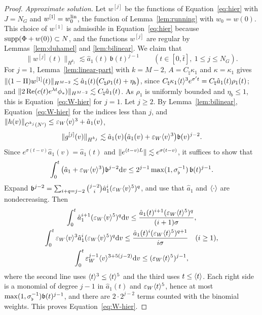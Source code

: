 \begin{proof}
\emph{Approximate solution.} Let $w^{[j]}$ be the functions of
Equation~\eqref{eq:hier} with $J=N_G$ and $w^{[1]}=w^{\mathrm{lin}}_0$, the function of
Lemma~\ref{lem:running} with $w_0=w(0)$. This choice of $w^{[1]}$ is admissible in
Equation~\eqref{eq:hier} because $\operatorname{supp}(\Phi+w(0))\subset N$, and the functions
$w^{[j]}$ are regular by Lemmas~\ref{lem:duhamel} and \ref{lem:bilinear}. We
claim that
\begin{equation}
\label{eq:W-hier}
\|w^{[j]}(t)\|_{H^{k_j}}\lesssim\hat a_1(t)\,\mathfrak b(t)^{j-1}\qquad(t\in[0,\bar t],\ 1\le j\le N_G).
\end{equation}
For $j=1$, Lemma~\ref{lem:linear-part} with $k=M-2$, $A=C_\natural\kappa_1$ and
$\kappa=\kappa_1$ gives
$\|(1-\Pi)w^{[1]}(t)\|_{H^{M-2}}\lesssim\hat a_1(t)\big(C_\natural\rho_1(t)+\eta_b\big)$,
since $C_\natural\kappa_1\langle t\rangle^3e^{\sigma't}=C_\natural\hat a_1(t)\rho_1(t)$; and
$\|2\Re(c(t)e^{\lambda t}\phi_*)\|_{H^{M-2}}\lesssim C_\natural\hat a_1(t)$. As
$\rho_1$ is uniformly bounded and $\eta_b\le1$, this is Equation~\eqref{eq:W-hier} for $j=1$.
Let $j\ge2$. By Lemma~\ref{lem:bilinear}, Equation~\eqref{eq:W-hier} for the
indices less than $j$, and
$\|h(v)\|_{C^{k_j}(N')}\le\varepsilon_W\langle v\rangle^3+\hat a_1(v)$,
\[
\|g^{[j]}(v)\|_{H^{k_j}}\lesssim\hat a_1(v)\big(\hat a_1(v)+\varepsilon_W\langle v\rangle^3\big)\mathfrak b(v)^{j-2}.
\]
Since $e^{\sigma(t-v)}\hat a_1(v)=\hat a_1(t)$ and
$\|e^{(t-v)L}\|\lesssim e^{\sigma(t-v)}$, it suffices to show that
\[
\int_0^t\big(\hat a_1+\varepsilon_W\langle v\rangle^3\big)\mathfrak b^{j-2}\dd v\le2^{j-1}\max(1,\sigma_\flat^{-1})\,\mathfrak b(t)^{j-1}.
\]
Expand $\mathfrak b^{j-2}=\sum_{i+q=j-2}\binom{j-2}i\hat a_1^i(\varepsilon_W\langle v\rangle^{5})^q$,
and use that $\hat a_1$ and $\langle \cdot\rangle$ are nondecreasing. Then
\[
\begin{gathered}
\int_0^t\hat a_1^{i+1}(\varepsilon_W\langle v\rangle^{5})^q\dd v\le\frac{\hat a_1(t)^{i+1}(\varepsilon_W\langle t\rangle^{5})^q}{(i+1)\sigma},\\
\int_0^t\varepsilon_W\langle v\rangle^3\hat a_1^i(\varepsilon_W\langle v\rangle^{5})^q\dd v\le\frac{\hat a_1(t)^i(\varepsilon_W\langle t\rangle^{5})^{q+1}}{i\sigma}\quad(i\ge1),\\
\int_0^t\varepsilon_W^{j-1}\langle v\rangle^{3+5(j-2)}\dd v\le(\varepsilon_W\langle t\rangle^{5})^{j-1},
\end{gathered}
\]
where the second line uses $\langle t\rangle^3\le\langle t\rangle^{5}$ and the third uses
$t\le\langle t\rangle$. Each right side is a monomial of degree $j-1$ in
$\hat a_1(t)$ and $\varepsilon_W\langle t\rangle^{5}$, hence at most
$\max(1,\sigma_\flat^{-1})\mathfrak b(t)^{j-1}$, and there are $2\cdot2^{j-2}$ terms counted with
the binomial weights. This proves Equation~\eqref{eq:W-hier}.


\end{proof}
